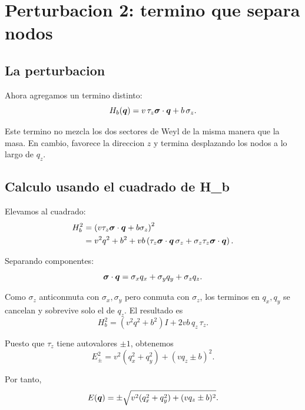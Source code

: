 \section{Perturbacion 2: termino que separa nodos}

\subsection{La perturbacion}

Ahora agregamos un termino distinto:
\begin{equation}
H_b(\bm{q})=v\,\tau_z \bm{\sigma}\cdot\bm{q} + b\,\sigma_z.
\label{c13:eq:Hb}
\end{equation}

Este termino no mezcla los dos sectores de Weyl de la misma manera que la masa. En cambio, favorece la direccion \(z\) y termina desplazando los nodos a lo largo de \(q_z\).

\subsection{Calculo usando el cuadrado de H\_b}

Elevamos al cuadrado:
\begin{align}
H_b^2
&=
\left(v\tau_z \bm{\sigma}\cdot\bm{q} + b\sigma_z\right)^2
\nonumber\\
&=
v^2 q^2 + b^2 + vb\left(\tau_z \bm{\sigma}\cdot\bm{q}\,\sigma_z + \sigma_z \tau_z \bm{\sigma}\cdot\bm{q}\right).
\end{align}

Separando componentes:
\begin{equation}
\bm{\sigma}\cdot\bm{q} = \sigma_x q_x + \sigma_y q_y + \sigma_z q_z.
\end{equation}

Como \(\sigma_z\) anticonmuta con \(\sigma_x,\sigma_y\) pero conmuta con \(\sigma_z\), los terminos en \(q_x,q_y\) se cancelan y sobrevive solo el de \(q_z\). El resultado es
\begin{equation}
H_b^2 = \left(v^2 q^2+b^2\right)I + 2vb\,q_z\,\tau_z.
\label{c13:eq:Hb-square}
\end{equation}

Puesto que \(\tau_z\) tiene autovalores \(\pm 1\), obtenemos
\begin{equation}
E_\pm^2 = v^2(q_x^2+q_y^2) + (v q_z \pm b)^2.
\label{c13:eq:split-spectrum-square}
\end{equation}

Por tanto,
\begin{equation}
E(\bm{q})=\pm \sqrt{v^2(q_x^2+q_y^2) + (v q_z \pm b)^2}.
\label{c13:eq:split-spectrum}
\end{equation}

